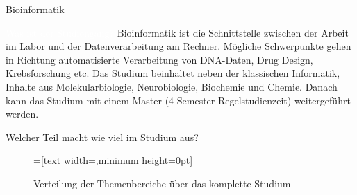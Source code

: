 
\begin{Huge}
    Bioinformatik
\end{Huge}

\begin{exampleblock}{\textcolor{white}{Was ist der Studiengang?}}
    Bioinformatik ist die Schnittstelle zwischen der Arbeit im Labor und der Datenverarbeitung am Rechner. Mögliche Schwerpunkte gehen in Richtung automatisierte Verarbeitung von DNA-Daten, Drug Design, Krebsforschung etc.
    Das Studium beinhaltet neben der klassischen Informatik, Inhalte aus Molekularbiologie, Neurobiologie, Biochemie und Chemie. Danach kann das Studium mit einem Master (4 Semester Regelstudienzeit) weitergeführt werden.
\end{exampleblock}

\begin{block}{Welcher Teil macht wie viel im Studium aus?}
    \begin{figure}[h!]
        \begin{minipage}{\linewidth}
            \centering
            =[text width={},minimum height=0pt]
        \end{minipage}
        \vspace{-20pt}
	\caption{Verteilung der Themenbereiche über das komplette Studium}
    \end{figure}
\end{block}

